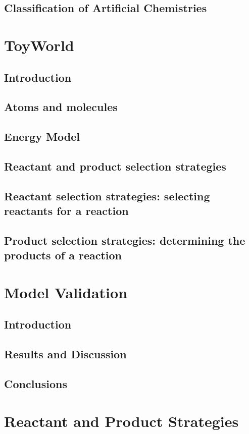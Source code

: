 \documentclass[]{report}
\begin{document}
\section{Classification of Artificial Chemistries}

\chapter{ToyWorld}
\section{Introduction}
\section{Atoms and molecules}
\section{Energy Model}
\section{Reactant and product selection strategies}
\section{Reactant selection strategies: selecting reactants for a reaction}
\section{Product selection strategies: determining the products of a reaction}

\chapter{Model Validation}
\section{Introduction}
\section{Results and Discussion}
\section{Conclusions}

\chapter{Reactant and Product Strategies}
\end{document}
